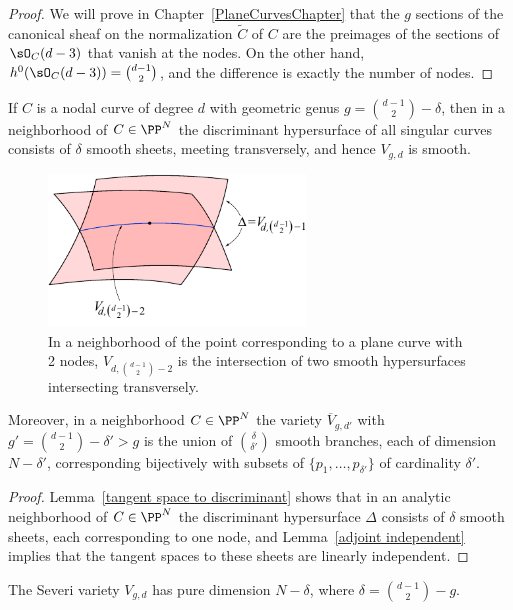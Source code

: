 \begin{proof}
We will prove in Chapter~\ref{PlaneCurvesChapter} that the $g$ sections of the canonical sheaf on the normalization $\widetilde C$ of
$C$ are the preimages of the sections of $\sO_C(d-3)$ that vanish at the nodes. On the other hand, 
$h^0(\sO_C(d-3)) = \binom{d-1}{2}$, and the difference is exactly the number of nodes.
\end{proof}

\begin{corollary}\label{local geometry of Severi}
If $C$ is a nodal curve of degree $d$ with geometric genus $g = \binom{d-1}{2}-\delta$, then in a neighborhood of $C\in \PP^N$
the discriminant hypersurface of all singular curves consists of $\delta$ smooth sheets, meeting transversely, and hence
$V_{g,d}$ is smooth. 

\begin{figure}\label{discriminant of a Severi locus}
\centerline {\includegraphics[height=1.6in]{"main/Fig07-3"}}
 \caption{In a neighborhood of the point corresponding to a plane curve with 2 nodes, $V_{d, \binom{d-1}{2}-2}$ is the intersection of two smooth hypersurfaces intersecting transversely.}
\end{figure}


Moreover, in a neighborhood  $C \in \PP^N$ 
the variety $\overline V_{g,d'}$ with $g' =  \binom{d-1}{2}-\delta' > g$ is the union of $\binom{\delta}{\delta'}$ smooth branches, each of dimension $N - \delta'$, corresponding bijectively with subsets of $\{p_1,\dots,p_{\delta'}\}$ of cardinality $\delta'$.
\end{corollary}
\begin{proof}
Lemma~\ref{tangent space to discriminant} shows that in an analytic neighborhood of $C\in \PP^N$ the discriminant hypersurface $\Delta$  consists of $\delta$ smooth sheets, each corresponding to one node, and Lemma~\ref{adjoint independent} implies that the tangent spaces to these sheets are linearly independent. 
\end{proof}


\begin{corollary}\label{dim Severi}
The  Severi variety $V_{g,d}$ has pure dimension $N - \delta$, where $\delta = \binom{d-1}{2} - g$.
\end{corollary}

